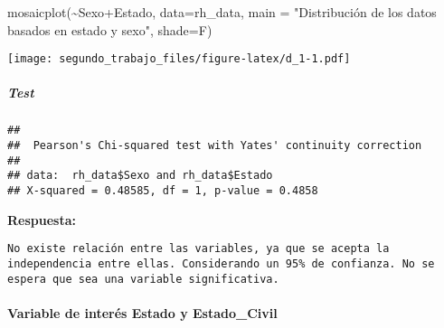 \documentclass[
]{article}
\newenvironment{Shaded}{\begin{snugshade}}{\end{snugshade}}
\newcommand{\AttributeTok}[1]{\textcolor[rgb]{0.77,0.63,0.00}{#1}}
\newcommand{\DecValTok}[1]{\textcolor[rgb]{0.00,0.00,0.81}{#1}}
\newcommand{\FunctionTok}[1]{\textcolor[rgb]{0.00,0.00,0.00}{#1}}
\newcommand{\NormalTok}[1]{#1}
\newcommand{\SpecialCharTok}[1]{\textcolor[rgb]{0.00,0.00,0.00}{#1}}
\newcommand{\StringTok}[1]{\textcolor[rgb]{0.31,0.60,0.02}{#1}}
\begin{document}
\begin{Shaded}
\begin{Highlighting}[]
\FunctionTok{mosaicplot}\NormalTok{(}\SpecialCharTok{\textasciitilde{}}\NormalTok{Sexo}\SpecialCharTok{+}\NormalTok{Estado, }\AttributeTok{data=}\NormalTok{rh\_data, }\AttributeTok{main =} \StringTok{"Distribución de los datos basados en estado y sexo"}\NormalTok{, }\AttributeTok{shade=}\NormalTok{F)}
\end{Highlighting}
\end{Shaded}

\texttt{[image: segundo\_trabajo\_files/figure-latex/d\_1-1.pdf]}

\hypertarget{test}{%
\subparagraph{Test}\label{test}}

\begin{Shaded}
\end{Shaded}

\begin{verbatim}
## 
##  Pearson's Chi-squared test with Yates' continuity correction
## 
## data:  rh_data$Sexo and rh_data$Estado
## X-squared = 0.48585, df = 1, p-value = 0.4858
\end{verbatim}

\textbf{Respuesta:}

\begin{verbatim}
No existe relación entre las variables, ya que se acepta la independencia entre ellas. Considerando un 95% de confianza. No se espera que sea una variable significativa.
\end{verbatim}

\hypertarget{variable-de-interuxe9s-estado-y-estado_civil}{%
\paragraph{Variable de interés Estado y
Estado\_Civil}\label{variable-de-interuxe9s-estado-y-estado_civil}}

\begin{Shaded}
\end{Shaded}
\end{document}
